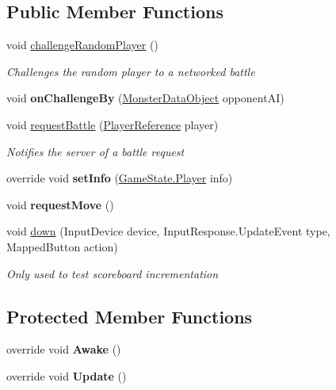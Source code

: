 \subsection*{Public Member Functions}
\begin{DoxyCompactItemize}
\item 
void \hyperlink{class_player_local_aa5c459588b976499120386eda1c1fac0}{challenge\-Random\-Player} ()
\begin{DoxyCompactList}\small\item\em Challenges the random player to a networked battle \end{DoxyCompactList}\item 
\hypertarget{class_player_local_aab51fb40e024127d177485ea82184dba}{void {\bfseries on\-Challenge\-By} (\hyperlink{class_monster_data_object}{Monster\-Data\-Object} opponent\-A\-I)}\label{class_player_local_aab51fb40e024127d177485ea82184dba}

\item 
void \hyperlink{class_player_local_a5344425e801a7f02419bf29ede2cb2af}{request\-Battle} (\hyperlink{class_player_reference}{Player\-Reference} player)
\begin{DoxyCompactList}\small\item\em Notifies the server of a battle request \end{DoxyCompactList}\item 
\hypertarget{class_player_local_a811782eb0815d88b3a1e5c8d23ee4903}{override void {\bfseries set\-Info} (\hyperlink{class_game_state_1_1_player}{Game\-State.\-Player} info)}\label{class_player_local_a811782eb0815d88b3a1e5c8d23ee4903}

\item 
\hypertarget{class_player_local_a71d5b41f860d3f8841f58a11aff1a6c3}{void {\bfseries request\-Move} ()}\label{class_player_local_a71d5b41f860d3f8841f58a11aff1a6c3}

\item 
void \hyperlink{class_player_local_ab718bcb062155f6de683dc8e78a799ba}{down} (Input\-Device device, Input\-Response.\-Update\-Event type, Mapped\-Button action)
\begin{DoxyCompactList}\small\item\em Only used to test scoreboard incrementation \end{DoxyCompactList}\end{DoxyCompactItemize}
\subsection*{Protected Member Functions}
\begin{DoxyCompactItemize}
\item 
\hypertarget{class_player_local_ab59f0a687fe4840df28008a6ea15eedf}{override void {\bfseries Awake} ()}\label{class_player_local_ab59f0a687fe4840df28008a6ea15eedf}

\item 
\hypertarget{class_player_local_ad2c22165846a385e21207c77e186b2c6}{override void {\bfseries Update} ()}\label{class_player_local_ad2c22165846a385e21207c77e186b2c6}

\end{DoxyCompactItemize}
